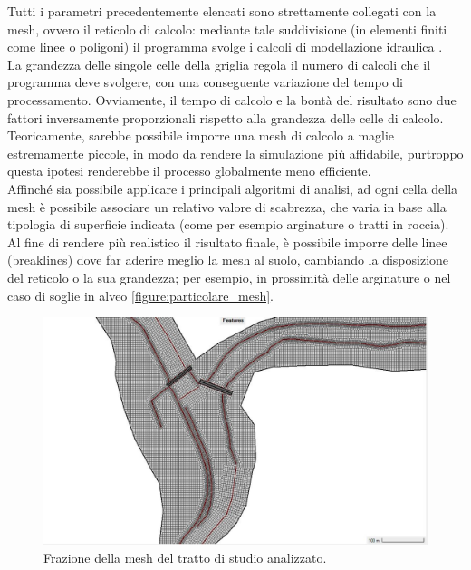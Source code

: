 Tutti i parametri precedentemente elencati sono strettamente collegati con la mesh, ovvero il reticolo di calcolo: mediante tale suddivisione (in elementi finiti come linee o poligoni) il programma svolge i calcoli di modellazione idraulica \cite{grid_and_dual_grid}.\\
La grandezza delle singole celle della griglia regola il numero di calcoli che il programma deve svolgere, con una conseguente variazione del tempo di processamento. Ovviamente, il tempo di calcolo e la bontà del risultato sono due fattori inversamente proporzionali rispetto alla grandezza delle celle di calcolo.\\
Teoricamente, sarebbe possibile imporre una mesh di calcolo a maglie estremamente piccole, in modo da rendere la simulazione più affidabile, purtroppo questa ipotesi renderebbe il processo globalmente meno efficiente.\\
Affinché sia possibile applicare i principali algoritmi di analisi, ad ogni cella della mesh è possibile associare un relativo valore di scabrezza, che varia in base alla tipologia di superficie indicata (come per esempio arginature o tratti in roccia).\\
Al fine di rendere più realistico il risultato finale, è possibile imporre delle linee (breaklines) dove far aderire meglio la mesh al suolo, cambiando la disposizione del reticolo o la sua grandezza; per esempio, in prossimità delle arginature o nel caso di soglie in alveo \eqref{figure:particolare_mesh}.

\begin{figure}[htb] \centering
    \includegraphics[scale=0.3]{immagini/particolare_mesh.JPG}
    \caption{Frazione della mesh del tratto di studio analizzato.}
    \label{figure:particolare_mesh}
\end{figure}

